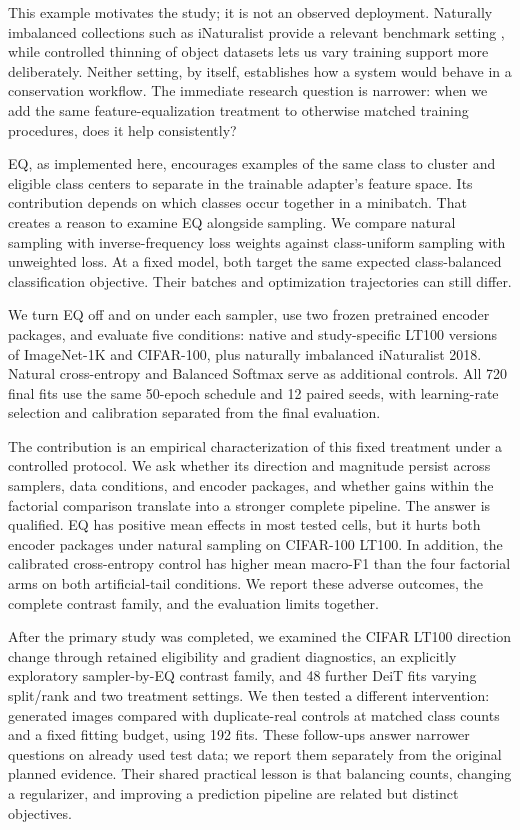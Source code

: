 \documentclass[conference]{IEEEtran}
\begin{document}
This example motivates the study; it is not an observed deployment. Naturally imbalanced collections such as iNaturalist provide a relevant benchmark setting \cite{vanhorn2018,inat2018}, while controlled thinning of object datasets lets us vary training support more deliberately. Neither setting, by itself, establishes how a system would behave in a conservation workflow. The immediate research question is narrower: when we add the same feature-equalization treatment to otherwise matched training procedures, does it help consistently?

EQ, as implemented here, encourages examples of the same class to cluster and eligible class centers to separate in the trainable adapter's feature space. Its contribution depends on which classes occur together in a minibatch. That creates a reason to examine EQ alongside sampling. We compare natural sampling with inverse-frequency loss weights against class-uniform sampling with unweighted loss. At a fixed model, both target the same expected class-balanced classification objective. Their batches and optimization trajectories can still differ.

We turn EQ off and on under each sampler, use two frozen pretrained encoder packages, and evaluate five conditions: native and study-specific LT100 versions of ImageNet-1K and CIFAR-100, plus naturally imbalanced iNaturalist 2018. Natural cross-entropy and Balanced Softmax serve as additional controls. All 720 final fits use the same 50-epoch schedule and 12 paired seeds, with learning-rate selection and calibration separated from the final evaluation.

The contribution is an empirical characterization of this fixed treatment under a controlled protocol. We ask whether its direction and magnitude persist across samplers, data conditions, and encoder packages, and whether gains within the factorial comparison translate into a stronger complete pipeline. The answer is qualified. EQ has positive mean effects in most tested cells, but it hurts both encoder packages under natural sampling on CIFAR-100 LT100. In addition, the calibrated cross-entropy control has higher mean macro-F1 than the four factorial arms on both artificial-tail conditions. We report these adverse outcomes, the complete contrast family, and the evaluation limits together.


After the primary study was completed, we examined the CIFAR LT100 direction change through retained eligibility and gradient diagnostics, an explicitly exploratory sampler-by-EQ contrast family, and 48 further DeiT fits varying split/rank and two treatment settings. We then tested a different intervention: generated images compared with duplicate-real controls at matched class counts and a fixed fitting budget, using 192 fits. These follow-ups answer narrower questions on already used test data; we report them separately from the original planned evidence. Their shared practical lesson is that balancing counts, changing a regularizer, and improving a prediction pipeline are related but distinct objectives.
\end{document}
